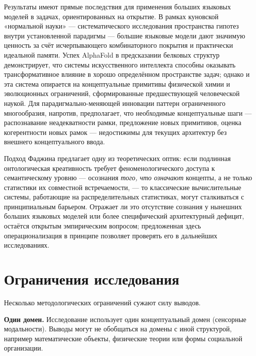 \documentclass[sn-mathphys-num]{sn-jnl}
\begin{document}
Результаты имеют прямые последствия для применения больших языковых моделей в задачах, ориентированных на открытие. В рамках куновской «нормальной науки» \cite{kuhn1962structure} --- систематического исследования пространства гипотез внутри установленной парадигмы --- большие языковые модели дают значимую ценность за счёт исчерпывающего комбинаторного покрытия и практически идеальной памяти. Успех AlphaFold в предсказании белковых структур \cite{jumper2021alphafold} демонстрирует, что системы искусственного интеллекта способны оказывать трансформативное влияние в хорошо определённом пространстве задач; однако и эта система опирается на концептуальные примитивы физической химии и эволюционных ограничений, сформированные предшествующей человеческой наукой. Для парадигмально-меняющей инновации паттерн ограниченного многообразия, напротив, предполагает, что необходимые концептуальные шаги --- распознавание неадекватности рамки, предложение новых примитивов, оценка когерентности новых рамок --- недостижимы для текущих архитектур без внешнего концептуального ввода.

Подход Фаджина \cite{faggin2024irreducible} предлагает одну из теоретических оптик: если подлинная онтологическая креативность требует феноменологического доступа к семантическому уровню --- осознания \emph{того, что означают} концепты, а не только статистики их совместной встречаемости, --- то классические вычислительные системы, работающие на распределительных статистиках, могут сталкиваться с принципиальным барьером. Отражает ли это отсутствие сознания у нынешних больших языковых моделей или более специфический архитектурный дефицит, остаётся открытым эмпирическим вопросом; предложенная здесь операционализация в принципе позволяет проверять его в дальнейших исследованиях.

\section{Ограничения исследования}
\label{sec:limits}

Несколько методологических ограничений сужают силу выводов.

\textbf{Один домен.} Исследование использует один концептуальный домен (сенсорные модальности). Выводы могут не обобщаться на домены с иной структурой, например математические объекты, физические теории или формы социальной организации.
\end{document}
